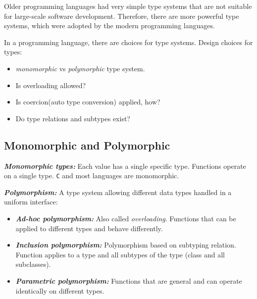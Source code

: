 Older programming languages had very simple type systems that are not suitable for large-scale software development. Therefore, there are more powerful type systems, which were adopted by the modern programming languages.

In a programming language, there are choices for type systems. Design choices for types:
\begin{itemize}
  \item \textit{monomorphic} vs \textit{polymorphic} type system.
  \item Is overloading allowed?
  \item Is coercion(auto type conversion) applied, how?
  \item Do type relations and subtypes exist?
\end{itemize}

\subsection*{Monomorphic and Polymorphic}

\textit{\textbf{Monomorphic types:}} Each value has a single specific type. Functions operate on a single type. \texttt{C} and most languages are
monomorphic.

\noindent \textit{\textbf{Polymorphism:}} A type system allowing different data types handled in a uniform interface:
\begin{itemize}
  \item \textit{\textbf{Ad-hoc polymorphism:}} Also called \textit{overloading}. Functions that can be applied to different types and behave differently.
  \item \textit{\textbf{Inclusion polymorphism:}} Polymorphism based on subtyping relation. Function applies to a type and all subtypes of the
  type (class and all subclasses).
  \item \textit{\textbf{Parametric polymorphism:}} Functions that are general and can operate identically on different types.
\end{itemize}